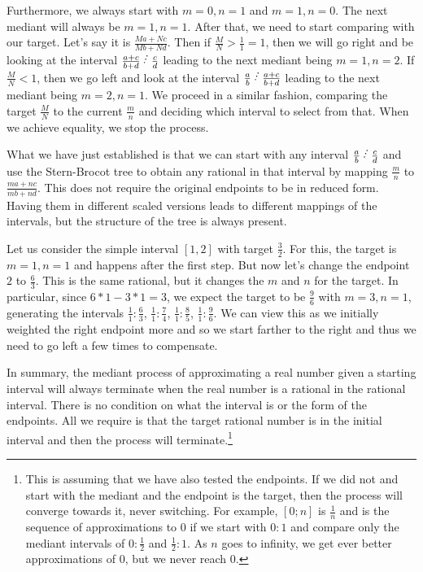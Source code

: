 \documentclass[12pt]{article}
\begin{document}
Furthermore, we always start with $m=0, n=1$ and $m=1, n=0$. The next mediant will always be $m=1, n=1$. After that, we need to start comparing with our target. Let's say it is $\frac{Ma + Nc}{Mb + Nd}$. Then if $\frac{M}{N} > \frac{1}{1} = 1$, then we will go right and be looking at the interval $\frac{a+c}{b+d} \lte  \frac{c}{d}$ leading to the next mediant being $m=1, n=2$. If $\frac{M}{N} < 1$, then we go left and look at the interval $\frac{a}{b} \lte \frac{a+c}{b+d}$ leading to the next mediant being $m=2, n=1$. We proceed in a similar fashion, comparing the target $\frac{M}{N}$ to the current $\frac{m}{n}$ and deciding which interval to select from that. When we achieve equality, we stop the process.

What we have just established is that we can start with any interval $\frac{a}{b} \lte \frac{c}{d}$ and use the Stern-Brocot tree to obtain any rational in that interval by mapping $\frac{m}{n}$ to $\frac{ma + nc}{mb + nd}$. This does not require the original endpoints to be in reduced form. Having them in different scaled versions leads to different mappings of the intervals, but the structure of the tree is always present. 

Let us consider the simple interval $[1, 2]$ with target $\frac{3}{2}$. For this, the target is $m=1, n=1$ and happens after the first step. But now let's change the endpoint $2$ to $\frac{6}{3}$. This is the same rational, but it changes the $m$ and $n$ for the target. In particular, since $6*1-3*1 = 3$, we expect the target to be $\frac{9}{6}$ with $m=3, n=1$, generating the intervals $\frac{1}{1} :\frac{6}{3}$,  $\frac{1}{1} :\frac{7}{4}$, $\frac{1}{1} :\frac{8}{5}$, $\frac{1}{1} :\frac{9}{6}$. We can view this as we initially weighted the right endpoint more and so we start farther to the right and thus we need to go left a few times to compensate. 

In summary, the mediant process of approximating a real number given a starting interval will always terminate when the real number is a rational in the rational interval. There is no condition on what the interval is or the form of the endpoints. All we require is that the target rational number is in the initial interval and then the process will terminate.\footnote{This is assuming that we have also tested the endpoints. If we did not and start with the mediant and the endpoint is the target, then the process will converge towards it, never switching. For example, $[0; n]$ is $\frac{1}{n}$ and is the sequence of approximations to $0$ if we start with $0:1$ and compare only the mediant intervals of $0:\frac{1}{2}$ and $\frac{1}{2}:1$. As $n$ goes to infinity, we get ever better approximations of $0$, but we never reach $0$.}



\medskip

\normalem %

\printbibliography
\end{document}

